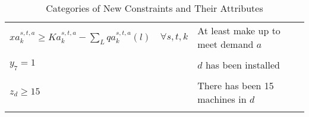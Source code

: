 \documentclass[fleqn,10pt]{wlscirep}
\begin{document}
\begin{table}[ht]
\begin{tabular}{l l l}
        \\[-0.5em]
        $xa_{k}^{s, t, a} \geq Ka_{k}^{s, t, a} - \sum_{L} qa_{k}^{s, t, a}(l)$ & $\forall s, t, k$ & At least make up to meet demand $a$ \\
        \\[-0.5em]
        $y_{7} = 1$ & & $d$ has been installed \\
        \\[-0.5em]
        $z_{d} \geq 15$ & & There has been 15 machines in $d$ \\
        \\[-0.5em]
        \hline
    \end{tabular}
    \caption{Categories of New Constraints and Their Attributes}
    \label{tab:3}
\end{table}
\FloatBarrier
\end{document}
